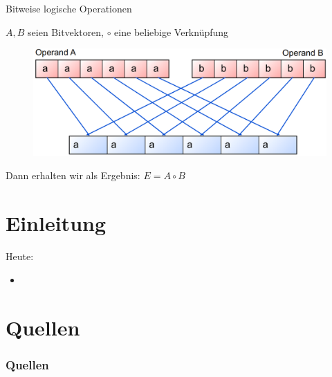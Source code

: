 \documentclass[12pt%
,aspectratio=169%
]{beamer}
\begin{document}
\begin{frame}{Bitweise logische Operationen}
\begin{center}
$A,B$ seien Bitvektoren, $\circ$ eine beliebige Verknüpfung
\begin{figure}
\includegraphics[scale=0.3]{pictures/bitvec}
\end{figure}
Dann erhalten wir als Ergebnis: $E = A \circ B$
\end{center}
\end{frame}

\section{Einleitung}
\begin{frame}{Heute:}
\begin{itemize}
	\item
\end{itemize}

\end{frame}


\section*{Quellen}
\appendix
\begin{frame}[allowframebreaks]
  \frametitle<presentation>{Quellen}
\printbibliography
\end{frame}
\end{document}
